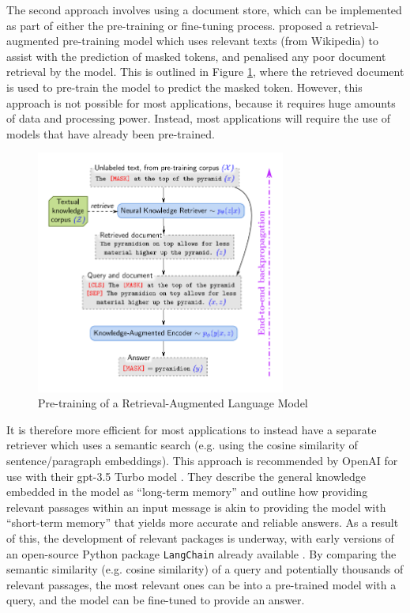 The second approach involves using a document store, which can be implemented as part of either the pre-training or fine-tuning process. \citet{documentStoreGuu} proposed a retrieval-augmented pre-training model which uses relevant texts (from Wikipedia) to assist with the prediction of masked tokens, and penalised any poor document retrieval by the model. This is outlined in Figure \ref{fig:document_store}, where the retrieved document is used to pre-train the model to predict the masked token. However, this approach is not possible for most applications, because it requires huge amounts of data and processing power. Instead, most applications will require the use of models that have already been pre-trained. 

\begin{figure}[h!]
    \centering
    \includegraphics[height=8cm,trim={0 0 0cm 0cm},clip]{paper/images/document_store.png}
    \caption{Pre-training of a Retrieval-Augmented Language Model \citep{documentStoreGuu}}
    \label{fig:document_store}
\end{figure}

It is therefore more efficient for most applications to instead have a separate retriever which uses a semantic search (e.g. using the cosine similarity of sentence/paragraph embeddings). This approach is recommended by OpenAI for use with their \acrshort{gpt}-3.5 Turbo model \citep{openai_cookbook_qa_embeddings}. They describe the general knowledge embedded in the model as ``long-term memory'' and outline how providing relevant passages within an input message is akin to providing the model with ``short-term memory'' that yields more accurate and reliable answers. As a result of this, the development of relevant packages is underway, with early versions of an open-source Python package \texttt{LangChain} already available \citep{langchain}. By comparing the semantic similarity (e.g. cosine similarity) of a query and potentially thousands of relevant passages, the most relevant ones can be into a pre-trained model with a query, and the model can be fine-tuned to provide an answer. 

